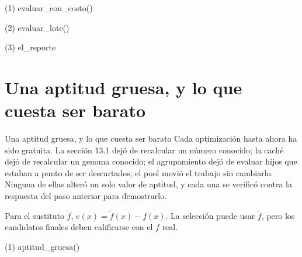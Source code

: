 \begin{frame}[fragile]{(1) evaluar\_con\_costo()}

\end{frame}

\begin{frame}[fragile]{(2) evaluar\_lote()}

\end{frame}

\begin{frame}[fragile]{(3) el\_reporte}

\end{frame}


\section{Una aptitud gruesa, y lo que cuesta ser barato}

\begin{frame}{Una aptitud gruesa, y lo que cuesta ser barato}
Cada optimización hasta ahora ha sido gratuita. La sección 13.1 dejó de recalcular un
número conocido; la caché dejó de recalcular un genoma conocido; el agrupamiento dejó de
evaluar hijos que estaban a punto de ser descartados; el pool movió el trabajo
sin cambiarlo. Ninguna de ellas alteró un solo valor de aptitud, y cada
una se verificó contra la respuesta del paso anterior para demostrarlo.

Para el sustituto \(\tilde f\), \(e(x)=\tilde f(x)-f(x)\). La selección puede
usar \(\tilde f\), pero los candidatos finales deben calificarse con el \(f\) real.
\end{frame}

\begin{frame}[fragile]{(1) aptitud\_gruesa()}

\end{frame}

